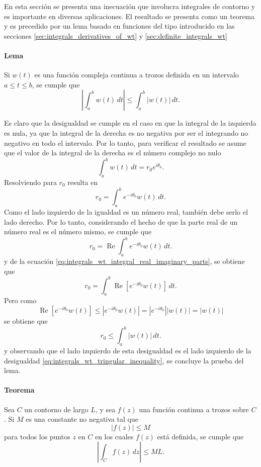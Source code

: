 \documentclass[a4paper]{report}
\renewcommand{\Re}{\operatorname{Re}}
\begin{document}
En esta sección se presenta una inecuación que involucra integrales de contorno y es importante en diversas aplicaciones. El resultado se presenta como un teorema y es precedido por un lema basado en funciones del tipo introducido en las secciones \ref{sec:integrals_derivatives_of_wt} y \ref{sec:definite_integrals_wt}

\paragraph{Lema} Si \(w(t)\) es una función compleja continua a trozos definida en un intervalo \(a\leq t\leq b\), se cumple que 
\begin{equation}\label{eq:integrals_wt_tringular_inequality}
 \left|\int_a^b w(t)\,dt\right|\leq\int_a^b|w(t)|\,dt.
\end{equation}

Es claro que la desigualdad se cumple en el caso en que la integral de la izquierda es nula, ya que la integral de la derecha es no negativa por ser el integrando no negativo en todo el intervalo. Por lo tanto, para verificar el resultado se asume que el valor de la integral de la derecha es el número complejo no nulo
\[
 \int_a^b w(t)\,dt=r_0e^{i\theta_0}.
\]
Resolviendo para \(r_0\) resulta en
\[
 r_0=\int_a^b e^{-i\theta_0}w(t)\,dt.
\]
Como el lado izquierdo de la igualdad es un número real, también debe serlo el lado derecho. Por lo tanto, considerando el hecho de que la parte real de un número real es el número mismo, se cumple que 
\[
 r_0=\Re\int_a^b e^{-i\theta_0}w(t)\,dt.
\]
y de la ecuación \ref{eq:integrals_wt_integral_real_imaginary_parts}, se obtiene que 
\[
 r_0=\int_a^b\Re[e^{-i\theta_0}w(t)]\,dt.
\]
Pero como
\[
 \Re[e^{-i\theta_0}w(t)]\leq|e^{-i\theta_0}w(t)|=|e^{-i\theta_0}||w(t)|=|w(t)|
\]
se obtiene que 
\[
 r_0\leq\int_a^b|w(t)|\,dt.
\]
y observando que el lado izquierdo de esta desigualdad es el lado izquierdo de la desigualdad \ref{eq:integrals_wt_tringular_inequality}, se concluye la prueba del lema.

\paragraph{Teorema} Sea \(C\) un contorno de largo \(L\), y sea \(f(z)\) una función continua a trozos sobre \(C\). Si \(M\) es una constante no negativa tal que 
\begin{equation}\label{eq:contour_integral_upper_bound_function_bound}
 |f(z)|\leq M 
\end{equation}
para todos los puntos \(z\) en \(C\) en los cuales \(f(z)\) está definida, se cumple que
\begin{equation}\label{eq:contour_integral_upper_bound}
 \left|\int_{C}f(z)\,dz\right|\leq ML.
\end{equation}
\end{document}
